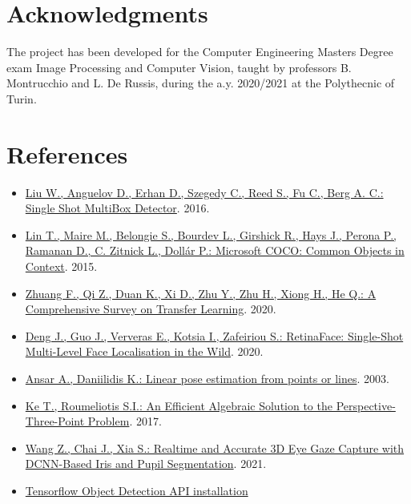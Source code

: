 \documentclass[a4paper, 12pt]{article}
\begin{document}
\section{Acknowledgments}
\label{Acks}
The project has been developed for the Computer Engineering Masters Degree exam Image Processing and Computer Vision, taught by professors B. Montrucchio and L. De Russis, during the a.y. 2020/2021 at the Polythecnic of Turin.

\onecolumn
\section{References}
\label{References}
\begin{flushleft}
\begin{itemize}
    \item \label{Ref1} \href{https://arxiv.org/abs/1512.02325}{Liu W., Anguelov D., Erhan D., Szegedy C., Reed S., Fu C., Berg A. C.: Single Shot MultiBox Detector}. 2016.
    \item \label{Ref2} \href{https://arxiv.org/abs/1405.0312}{Lin T., Maire M., Belongie S., Bourdev L., Girshick R., Hays J., Perona P., Ramanan D., C. Zitnick L., Dollár P.: Microsoft COCO: Common Objects in Context}. 2015.
    \item \label{Ref3} \href{https://arxiv.org/abs/1911.02685}{Zhuang F., Qi Z., Duan K., Xi D., Zhu Y., Zhu H., Xiong H., He Q.: A Comprehensive Survey on Transfer Learning}. 2020.
    \item \label{Ref4} \href{https://openaccess.thecvf.com/content_CVPR_2020/html/Deng_RetinaFace_Single-Shot_Multi-Level_Face_Localisation_in_the_Wild_CVPR_2020_paper.html}{ Deng J., Guo J., Ververas E., Kotsia I., Zafeiriou S.: RetinaFace: Single-Shot Multi-Level Face Localisation in the Wild}. 2020.
    \item \label{Ref5} \href{https://ieeexplore.ieee.org/document/1195992}{Ansar A., Daniilidis K.: Linear pose estimation from points or lines}. 2003.
    \item \label{Ref6} \href{https://openaccess.thecvf.com/content_cvpr_2017/html/Ke_An_Efficient_Algebraic_CVPR_2017_paper.html}{ Ke T., Roumeliotis S.I.: An Efficient Algebraic Solution to the Perspective-Three-Point Problem}. 2017.
    \item \label{Ref7} \href{https://ieeexplore.ieee.org/document/8818661}{Wang Z., Chai J., Xia S.: Realtime and Accurate 3D Eye Gaze Capture with DCNN-Based Iris and Pupil Segmentation}. 2021.
    \item \label{Ref8} \href{https://tensorflow-object-detection-api-tutorial.readthedocs.io/en/latest/}{Tensorflow Object Detection API installation}

\end{itemize}
\end{flushleft}
\end{document}
